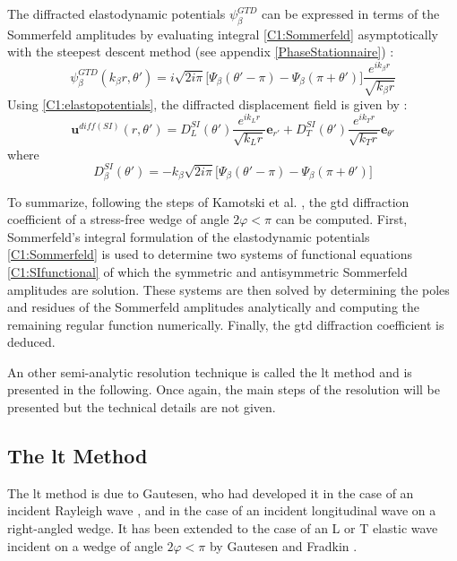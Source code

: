 The diffracted elastodynamic potentials $\psi_{\beta}^{GTD} $ can be expressed in terms of the Sommerfeld amplitudes by evaluating integral \eqref{C1:Sommerfeld} asymptotically with the steepest descent method (see appendix \ref{PhaseStationnaire}) :
\begin{equation}
\psi_{\beta}^{GTD}(k_{\beta} r,\theta')=i\sqrt{2i\pi}\lbrack \Psi_{\beta}(\theta'-\pi)-\Psi_{\beta}(\pi+\theta')\rbrack \dfrac{e^{ik_{\beta}r}}{\sqrt{k_{\beta}r}}
\end{equation}
Using \eqref{C1:elastopotentials}, the diffracted displacement field is given by :
\begin{equation}
\mathbf{u}^{diff(SI)}(r,\theta')=D_L^{SI}(\theta')\dfrac{e^{ik_Lr}}{\sqrt{k_Lr}}\mathbf{e}_{r'}+D_T^{SI}(\theta')\dfrac{e^{ik_Tr}}{\sqrt{k_Tr}}\mathbf{e}_{\theta'}
\end{equation}
where
\begin{equation}
D_{\beta}^{SI}(\theta')=-k_{\beta}\sqrt{2i\pi}\lbrack \Psi_{\beta}(\theta'-\pi)-\Psi_{\beta}(\pi+\theta')\rbrack
\end{equation}

To summarize, following the steps of Kamotski et al. \cite{KamotskiFradkin}, the \acrshort{gtd} diffraction coefficient of a stress-free wedge of angle $2\varphi<\pi$ can be computed. First, Sommerfeld's integral formulation of the elastodynamic potentials \eqref{C1:Sommerfeld} is used to determine two systems of functional equations \eqref{C1:SIfunctional} of which the symmetric and antisymmetric Sommerfeld amplitudes are solution. These systems are then solved by determining the poles and residues of the Sommerfeld amplitudes analytically and computing the remaining regular function numerically. Finally, the \acrshort{gtd} diffraction coefficient is deduced. 

An other semi-analytic resolution technique is called the \acrfull{lt} method and is presented in the following. Once again, the main steps of the resolution will be presented but the technical details are not given.

\subsection{The \acrfull{lt} Method}
\label{C1:lt}
The \acrfull{lt} method is due to Gautesen, who had developed it in the case of an incident Rayleigh wave \cite{GautesenRayleigh,GautesenRayleigh2,GautesenRayleigh0,GautesenRayleigh4,GautesenRayleigh3}, and in the case of an incident longitudinal wave on a right-angled wedge\cite{GautesenLwave}. It has been extended to the case of an L or T elastic wave incident on a wedge of angle $2\varphi<\pi$ by Gautesen and Fradkin \cite{GautesenFradkin}.

